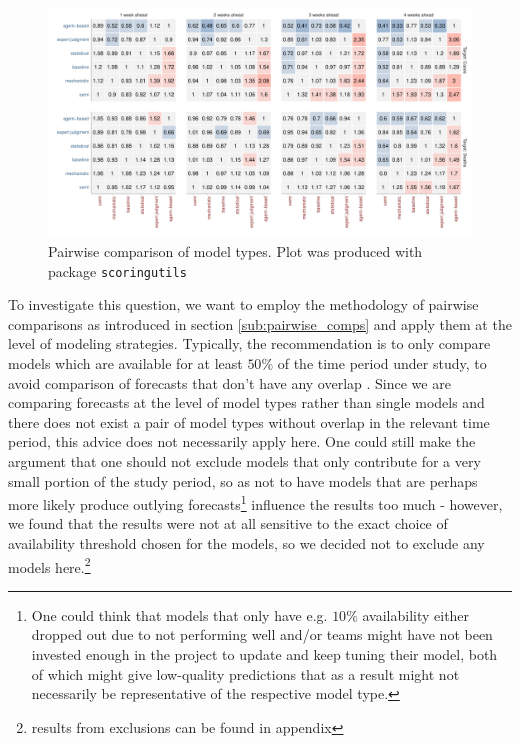 \begin{figure}
\centering{}
\includegraphics[width = \textwidth]{../plots/pw_comp_model_type_with_other_wide.pdf}
\caption{Pairwise comparison of model types. Plot was produced with package \texttt{scoringutils}}
\label{fig:pw_comp_modeltypes}
\end{figure}
To investigate this question, we want to employ the methodology of pairwise comparisons as introduced in section \ref{sub:pairwise_comps} and apply them at the level of modeling strategies. Typically, the recommendation is to only compare models which are available for at least $50\% $ of the time period under study, to avoid comparison of forecasts that don't have any overlap \citep{bosse_epiforecastsscoringutils_2022}. Since we are comparing forecasts at the level of model types rather than single models and there does not exist a pair of model types without overlap in the relevant time period, this advice does not necessarily apply here. One could still make the argument that one should not exclude models that only contribute for a very small portion of the study period, so as not to have models that are perhaps more likely produce outlying forecasts\footnote{One could think that models that only have e.g. $10\%$ availability either dropped out due to not performing well and/or teams might have not been invested enough in the project to update and keep tuning their model, both of which might give low-quality predictions that as a result might not necessarily be representative of the respective model type.} influence the results too much - however, we found that the results were not at all sensitive to the exact choice of availability threshold chosen for the models, so we decided not to exclude any models here.\footnote{results from exclusions can be found in appendix} \\ 
